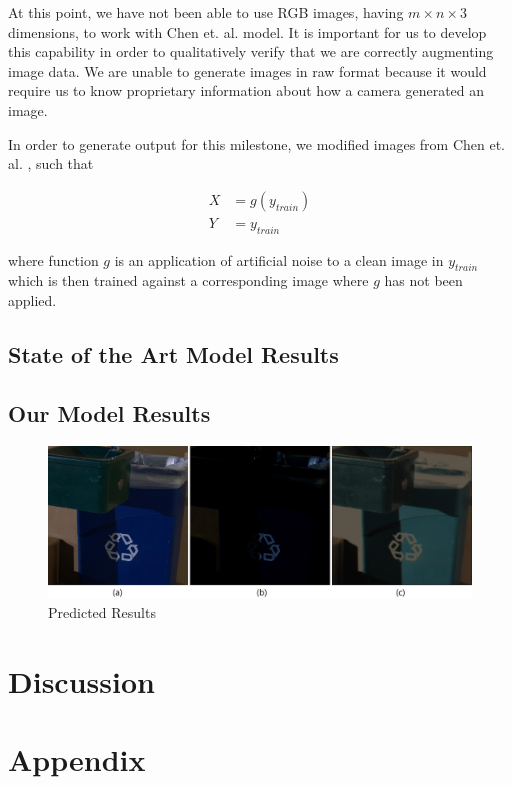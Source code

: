 \documentclass{article}
\begin{document}
At this point, we have not been able to use RGB images, having
$m \times n \times 3$ dimensions, to work with Chen et. al.
\cite{chen2018learning} model. It is important for us to develop this
capability in order to qualitatively verify that we are correctly augmenting
image data. We are unable to generate images in raw format because
it would require us to know proprietary information about how a camera
generated an image.

In order to generate output for this milestone, we modified images from
Chen et. al. \cite{chen2018learning}, such that

\begin{align*}
  X &= g(y_{train})\\
  Y &= y_{train}
\end{align*}

where function $g$ is an application of artificial noise to a clean
image in $y_{train}$ which is then trained against a corresponding
image where $g$ has not been applied.

\subsection{State of the Art Model Results}

\subsection{Our Model Results}

\begin{figure}[ht]
  \centering
  \includegraphics[scale=0.1]{trashcan_original_simmulated_and_our_result}
  \caption{ Predicted Results}
  \label{fig:train}
\end{figure}


\section{Discussion}


\section{Appendix}



\end{document}
